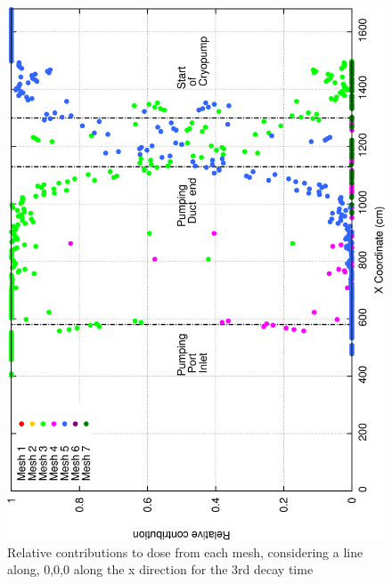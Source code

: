 \documentclass[12pt]{article}
\begin{document}
\begin{figure}[ht!]
\centering
\includegraphics[clip,scale=0.25]{../plots/crosstalk/b4c/lp/dc3_rel.png}
\caption{Relative contributions to dose from each mesh, considering a line along, 0,0,0 along the x direction for the 3rd decay time}
\label{fig:b4c_ct_lp_dc3_rel}
\end{figure}
\end{document}
